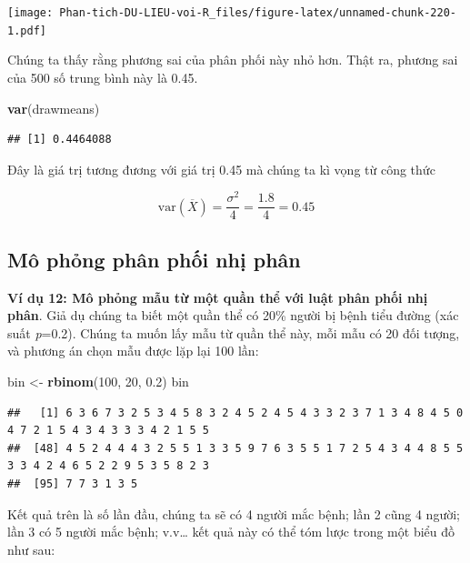 \documentclass[
]{book}
\newenvironment{Shaded}{\begin{snugshade}}{\end{snugshade}}
\newcommand{\DecValTok}[1]{\textcolor[rgb]{0.00,0.00,0.81}{#1}}
\newcommand{\FloatTok}[1]{\textcolor[rgb]{0.00,0.00,0.81}{#1}}
\newcommand{\KeywordTok}[1]{\textcolor[rgb]{0.13,0.29,0.53}{\textbf{#1}}}
\newcommand{\NormalTok}[1]{#1}
\newcommand{\StringTok}[1]{\textcolor[rgb]{0.31,0.60,0.02}{#1}}
\begin{document}
\texttt{[image: Phan-tich-DU-LIEU-voi-R\_files/figure-latex/unnamed-chunk-220-1.pdf]}

Chúng ta thấy rằng phương sai của phân phối này nhỏ hơn. Thật ra, phương sai của 500 số trung bình này là 0.45.

\begin{Shaded}
\begin{Highlighting}[]
\KeywordTok{var}\NormalTok{(drawmeans)}
\end{Highlighting}
\end{Shaded}

\begin{verbatim}
## [1] 0.4464088
\end{verbatim}

Đây là giá trị tương đương với giá trị 0.45 mà chúng ta kì vọng từ công thức

\[\text{var}\left( \overline{X} \right) = \frac{\sigma^{2}}{4} = \frac{1.8}{4} = 0.45\]

\hypertarget{muxf4-phux1ecfng-phuxe2n-phux1ed1i-nhux1ecb-phuxe2n}{%
\subsection{Mô phỏng phân phối nhị phân}\label{muxf4-phux1ecfng-phuxe2n-phux1ed1i-nhux1ecb-phuxe2n}}

\textbf{Ví dụ 12: Mô phỏng mẫu từ một quần thể với luật phân phối nhị phân}. Giả dụ chúng ta biết một quần thể có 20\% người bị bệnh tiểu đường (xác suất \emph{p}=0.2). Chúng ta muốn lấy mẫu từ quần thể này, mỗi mẫu có 20 đối tượng, và phương án chọn mẫu được lặp lại 100 lần:

\begin{Shaded}
\begin{Highlighting}[]
\NormalTok{bin \textless{}{-}}\StringTok{ }\KeywordTok{rbinom}\NormalTok{(}\DecValTok{100}\NormalTok{, }\DecValTok{20}\NormalTok{, }\FloatTok{0.2}\NormalTok{)}
\NormalTok{bin}
\end{Highlighting}
\end{Shaded}

\begin{verbatim}
##   [1] 6 3 6 7 3 2 5 3 4 5 8 3 2 4 5 2 4 5 4 3 3 2 3 7 1 3 4 8 4 5 0 4 7 2 1 5 4 3 4 3 3 3 4 2 1 5 5
##  [48] 4 5 2 4 4 4 3 2 5 5 1 3 3 5 9 7 6 3 5 5 1 7 2 5 4 3 4 4 8 5 5 3 3 4 2 4 6 5 2 2 9 5 3 5 8 2 3
##  [95] 7 7 3 1 3 5
\end{verbatim}

Kết quả trên là số lần đầu, chúng ta sẽ có 4 người mắc bệnh; lần 2 cũng 4 người; lần 3 có 5 người mắc bệnh; v.v\ldots{} kết quả này có thể tóm lược trong một biểu đồ như sau:
\end{document}
